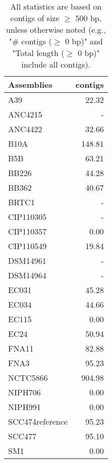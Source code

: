 \documentclass[12pt,a4paper]{article}
\begin{document}
\begin{table}[ht]
\begin{center}
\caption{All statistics are based on contigs of size $\geq$ 500 bp, unless otherwise noted (e.g., "\# contigs ($\geq$ 0 bp)" and "Total length ($\geq$ 0 bp)" include all contigs).}
\begin{tabular}{|l*{1}{|r}|}
\hline
Assemblies & contigs \\ \hline
A39 & 22.32 \\ \hline
ANC4215 & - \\ \hline
ANC4422 & 32.66 \\ \hline
B10A & 148.81 \\ \hline
B5B & 63.21 \\ \hline
BB226 & 44.28 \\ \hline
BB362 & 40.67 \\ \hline
BRTC1 & - \\ \hline
CIP110305 & - \\ \hline
CIP110357 & 0.00 \\ \hline
CIP110549 & 19.84 \\ \hline
DSM14961 & - \\ \hline
DSM14964 & - \\ \hline
EC031 & 45.28 \\ \hline
EC034 & 44.66 \\ \hline
EC115 & 0.00 \\ \hline
EC24 & 50.94 \\ \hline
FNA11 & 82.88 \\ \hline
FNA3 & 95.23 \\ \hline
NCTC5866 & 904.98 \\ \hline
NIPH706 & 0.00 \\ \hline
NIPH991 & 0.00 \\ \hline
SCC474reference & 95.23 \\ \hline
SCC477 & 95.10 \\ \hline
SM1 & 0.00 \\ \hline
\end{tabular}
\end{center}
\end{table}
\end{document}
